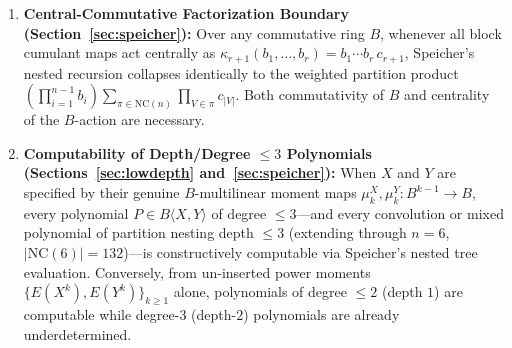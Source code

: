 \documentclass[11pt,a4paper]{article}
\theoremstyle{definition}
\newcommand{\NC}{\mathrm{NC}}
\begin{document}
\begin{enumerate}
\item \textbf{Central-Commutative Factorization Boundary (Section~\ref{sec:speicher}):} Over any commutative ring $B$, whenever all block cumulant maps act centrally as $\kappa_{r+1}(b_1, \dots, b_r) = b_1 \cdots b_r \, c_{r+1}$, Speicher's nested recursion collapses identically to the weighted partition product $(\prod_{i=1}^{n-1} b_i) \sum_{\pi \in \NC(n)} \prod_{V \in \pi} c_{|V|}$. Both commutativity of $B$ and centrality of the $B$-action are necessary.

\item \textbf{Computability of Depth/Degree $\le 3$ Polynomials (Sections~\ref{sec:lowdepth} and~\ref{sec:speicher}):} When $X$ and $Y$ are specified by their genuine $B$-multilinear moment maps $\mu_k^X, \mu_k^Y \colon B^{k-1} \to B$, every polynomial $P \in B\langle X, Y \rangle$ of degree $\le 3$---and every convolution or mixed polynomial of partition nesting depth $\le 3$ (extending through $n = 6$, $|\NC(6)| = 132$)---is constructively computable via Speicher's nested tree evaluation. Conversely, from un-inserted power moments $\{E(X^k), E(Y^k)\}_{k \ge 1}$ alone, polynomials of degree $\le 2$ (depth $1$) are computable while degree-$3$ (depth-$2$) polynomials are already underdetermined.
\end{enumerate}
\end{document}
